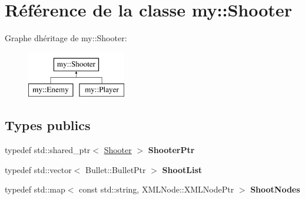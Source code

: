 \hypertarget{classmy_1_1Shooter}{}\section{Référence de la classe my\+:\+:Shooter}
\label{classmy_1_1Shooter}
Graphe d\textquotesingle{}héritage de my\+:\+:Shooter\+:\begin{figure}[H]
\begin{center}
\leavevmode
\includegraphics[height=2.000000cm]{classmy_1_1Shooter}
\end{center}
\end{figure}
\subsection*{Types publics}
\begin{DoxyCompactItemize}
\item 
\mbox{\label{classmy_1_1Shooter_a82aae5a56bed644b983bfb3f926950d2}} 
typedef std\+::shared\+\_\+ptr$<$ \hyperlink{classmy_1_1Shooter}{Shooter} $>$ {\bfseries Shooter\+Ptr}
\item 
\mbox{\label{classmy_1_1Shooter_adc320a69e79962464e86f701d2b728d1}} 
typedef std\+::vector$<$ Bullet\+::\+Bullet\+Ptr $>$ {\bfseries Shoot\+List}
\item 
\mbox{\label{classmy_1_1Shooter_ad2fe17c54adc480568a891fb04ce8242}} 
typedef std\+::map$<$ const std\+::string, X\+M\+L\+Node\+::\+X\+M\+L\+Node\+Ptr $>$ {\bfseries Shoot\+Nodes}
\end{DoxyCompactItemize}

